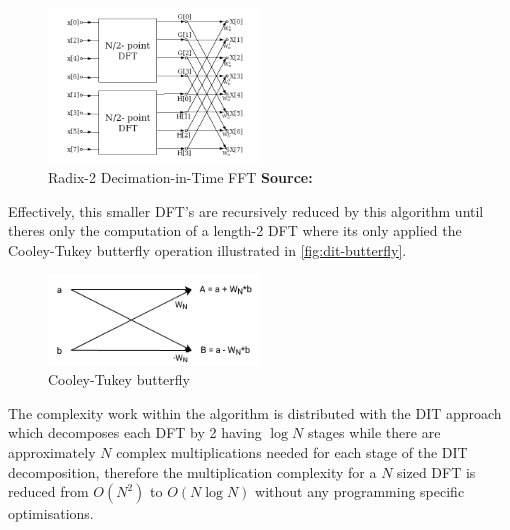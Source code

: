 \documentclass[
  oneside,
  11pt, a4paper,
  footinclude=true,
  headinclude=true,
  cleardoublepage=empty
]{scrbook}
\newcommand*{\source}[1]{%
    \textbf{Source:} \cite{#1}%
}
\begin{document}
\begin{figure}[h] 
    \centering
    \includegraphics[width=0.5\textwidth]{imgs/dit_fft.png}
    \caption{Radix-2 Decimation-in-Time FFT \source{jones2014digital}}
    \label{fig:dit-fft}
\end{figure}


Effectively, this smaller DFT's are recursively reduced by this algorithm until theres only the computation of a length-2 DFT where its only applied the Cooley-Tukey butterfly operation \cite{chu1999inside} illustrated in \autoref{fig:dit-butterfly}.

\begin{figure}[h] 
    \centering
    \includegraphics[width=0.5\textwidth]{imgs/dit_butterfly.png}
    \caption{Cooley-Tukey butterfly}
    \label{fig:dit-butterfly}
\end{figure}


The complexity work within the algorithm is distributed with the DIT approach which decomposes each DFT by 2 having \(\log{N}\) stages \cite{smith2007mathematics} while there are approximately \(N\) complex multiplications needed for each stage of the DIT decomposition, therefore the multiplication complexity for a \(N\) sized DFT is reduced from \(O(N^{2})\) to \(O(N \log{N})\) without any programming specific optimisations.
\end{document}
